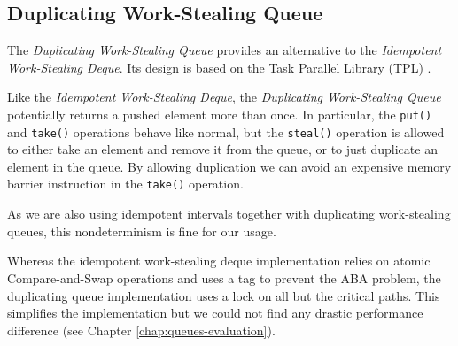 \subsection{Duplicating Work-Stealing Queue}
\label{sec:queues-alternative-implementations-duplicating-queue}

The \emph{Duplicating Work-Stealing Queue} provides an alternative to
the \emph{Idempotent Work-Stealing Deque}. Its design is based on the
Task Parallel Library (TPL) \cite{Leijen2009}.

Like the \emph{Idempotent Work-Stealing Deque}, the \emph{Duplicating
  Work-Stealing Queue} potentially returns a pushed element more than
once. In particular, the \lstinline!put()!  and \lstinline!take()!
operations behave like normal, but the \lstinline!steal()! operation
is allowed to either take an element and remove it from the queue, or
to just duplicate an element in the queue. By allowing duplication we
can avoid an expensive memory barrier instruction in the
\lstinline!take()! operation.

As we are also using idempotent intervals together with duplicating
work-stealing queues, this nondeterminism is fine for our usage.

Whereas the idempotent work-stealing deque implementation relies on
atomic Compare-and-Swap operations and uses a tag to prevent the ABA
problem, the duplicating queue implementation uses a lock on all but
the critical paths. This simplifies the implementation but we could
not find any drastic performance difference (see Chapter
\ref{chap:queues-evaluation}).


